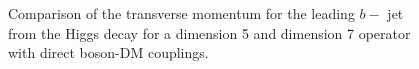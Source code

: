    \begin{figure}[hbpt!]
   	\centering
   	\hfill
   	\caption{Comparison of the transverse momentum for the leading $b-$ jet from the Higgs decay for a dimension 5 and dimension 7 operator
   		with direct boson-DM couplings.}
   	\end{figure}
  

